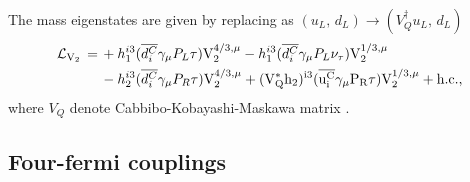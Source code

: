 \documentclass[12pt, a4paper]{article}
\numberwithin{equation}{section} %
\newcommand{\ov}{\overline}
\newcommand{\1}{\mbox{1}\hspace{-0.25em}\mbox{l}}
\begin{document}
The mass eigenstates are given by replacing as 
$(u_L,\,d_L) \to (V_Q^\dagger u_L,\,d_L)$
\begin{align}
{{\cal{L}}_{\rm{V}_2}}\,=\,&+h_{1}^{i3}(\ov{d^{C}_i}\gamma_\mu P_L \tau){\rm{V}_2^{4/3,\mu}}-h_{1}^{i3}(\ov{d^{C}_i}\gamma_\mu  P_L \nu_{\tau})\rm{V}_2^{1/3,\mu}\nonumber\\
&-h_{2}^{i3}(\ov{d^{C}_i}\gamma_\mu  P_R \tau)\rm{V}_2^{4/3,\mu}+(V_Q^*h_{2})^{i3}(\ov{u^{C}_i}\gamma_\mu  P_R \tau)\rm{V}_2^{1/3,\mu}+\rm{h.c.},
\label{Eq:fermoin_VQ2}
\end{align}
where $V_Q$ denote 
Cabbibo-Kobayashi-Maskawa matrix \cite{Cabibbo:1963yz,Kobayashi:1973fv}.


\subsection{Four-fermi couplings}
\label{sec:fourfermi}
\end{document}
